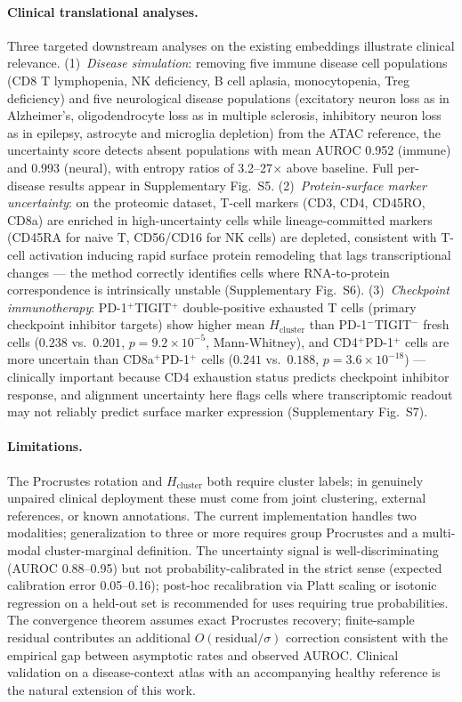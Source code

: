 \documentclass[pmlr]{jmlr}
\newcommand{\Hcluster}{H_{\text{cluster}}}
\begin{document}
\paragraph{Clinical translational analyses.} Three targeted downstream analyses on the existing embeddings illustrate clinical relevance. (1)~\emph{Disease simulation}: removing five immune disease cell populations (CD8 T lymphopenia, NK deficiency, B cell aplasia, monocytopenia, Treg deficiency) and five neurological disease populations (excitatory neuron loss as in Alzheimer's, oligodendrocyte loss as in multiple sclerosis, inhibitory neuron loss as in epilepsy, astrocyte and microglia depletion) from the ATAC reference, the uncertainty score detects absent populations with mean AUROC 0.952 (immune) and 0.993 (neural), with entropy ratios of 3.2--27$\times$ above baseline. Full per-disease results appear in Supplementary Fig.~S5. (2)~\emph{Protein-surface marker uncertainty}: on the proteomic dataset, T-cell markers (CD3, CD4, CD45RO, CD8a) are enriched in high-uncertainty cells while lineage-committed markers (CD45RA for naive T, CD56/CD16 for NK cells) are depleted, consistent with T-cell activation inducing rapid surface protein remodeling that lags transcriptional changes --- the method correctly identifies cells where RNA-to-protein correspondence is intrinsically unstable (Supplementary Fig.~S6). (3)~\emph{Checkpoint immunotherapy}: PD-1$^+$TIGIT$^+$ double-positive exhausted T cells (primary checkpoint inhibitor targets) show higher mean $\Hcluster$ than PD-1$^-$TIGIT$^-$ fresh cells ($0.238$ vs.\ $0.201$, $p = 9.2 \times 10^{-5}$, Mann-Whitney), and CD4$^+$PD-1$^+$ cells are more uncertain than CD8a$^+$PD-1$^+$ cells ($0.241$ vs.\ $0.188$, $p = 3.6 \times 10^{-18}$) --- clinically important because CD4 exhaustion status predicts checkpoint inhibitor response, and alignment uncertainty here flags cells where transcriptomic readout may not reliably predict surface marker expression (Supplementary Fig.~S7).

\paragraph{Limitations.} The Procrustes rotation and $\Hcluster$ both require cluster labels; in genuinely unpaired clinical deployment these must come from joint clustering, external references, or known annotations. The current implementation handles two modalities; generalization to three or more requires group Procrustes and a multi-modal cluster-marginal definition. The uncertainty signal is well-discriminating (AUROC 0.88--0.95) but not probability-calibrated in the strict sense (expected calibration error 0.05--0.16); post-hoc recalibration via Platt scaling or isotonic regression on a held-out set is recommended for uses requiring true probabilities. The convergence theorem assumes exact Procrustes recovery; finite-sample residual contributes an additional $O(\text{residual}/\sigma)$ correction consistent with the empirical gap between asymptotic rates and observed AUROC. Clinical validation on a disease-context atlas with an accompanying healthy reference is the natural extension of this work.
\end{document}
